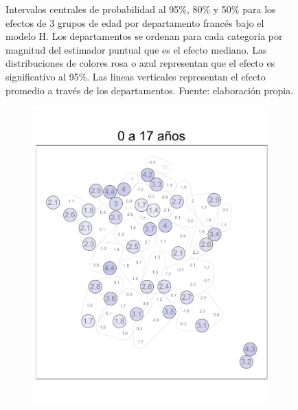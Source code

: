 \begin{figure}
\begin{subfigure}{0.3\textwidth}
	\end{subfigure}
	\caption{Intervalos centrales de probabilidad al 95\%, 80\% y 50\% para los efectos de 3 grupos de edad por departamento francés bajo el modelo H. Los departamentos se ordenan para cada categoría por magnitud del estimador puntual que es el efecto mediano. Las distribuciones de colores rosa o azul representan que el efecto es significativo al 95\%. Las lineas verticales representan el efecto promedio a través de los departamentos. Fuente: elaboración propia.}
	\label{fig:Efectos_Edad_2}
\end{figure}

\begin{figure}
	\centering
	\begin{subfigure}{0.3\textwidth}
	\includegraphics[width = \textwidth]{Figs/Efectos/Dorling_Efectos_Ed1_Modelo_H}
	\end{subfigure}
	~
	\begin{subfigure}{0.3\textwidth}

\end{subfigure}
\end{figure}
